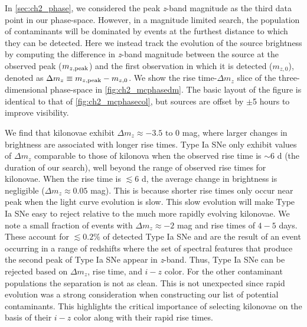 In \autoref{sec:ch2_phase}, we considered the peak {\em z}-band magnitude as the third data point in our phase-space. However, in a magnitude limited search, the population of contaminants will be dominated by events at the furthest distance to which they can be detected. Here we instead track the evolution of the source brightness by computing the difference in {\em z}-band magnitude between the source at the observed peak ($m_{z,{\rm peak}}$) and the first observation in which it is detected ($m_{z,0}$), denoted as $\Delta m_z \equiv m_{z,{\rm peak}} - m_{z,0}$. We show the rise time-$\Delta m_z$ slice of the three-dimensional phase-space in \autoref{fig:ch2_mcphasedm}. The basic layout of the figure is identical to that of \autoref{fig:ch2_mcphasecol}, but sources are offset by $\pm$5 hours to improve visibility.

We find that kilonovae exhibit $\Delta m_z \approx -3.5\text{ to }0$ mag, where larger changes in brightness are associated with longer rise times. Type Ia SNe only exhibit values of $\Delta m_z$ comparable to those of kilonova when the observed rise time is $\sim6$ d (the duration of our search), well beyond the range of observed rise times for kilonovae. When the rise time is $\lesssim6$ d, the average change in brightness is negligible ($\Delta m_z \approx 0.05$ mag). This is because shorter rise times only occur near peak when the light curve evolution is slow. This slow evolution will make Type Ia SNe easy to reject relative to the much more rapidly evolving kilonovae. We note a small fraction of events with $\Delta m_z \approx -2$ mag and rise times of $4-5$ days. These account for $\lesssim0.2\%$ of detected Type Ia SNe and are the result of an event occurring in a range of redshifts where the set of spectral features that produce the second peak of Type Ia SNe appear in {\em z}-band. Thus, Type Ia SNe can be rejected based on $\Delta m_z$, rise time, and $i-z$ color. For the other contaminant populations the separation is not as clean. This is not unexpected since rapid evolution was a strong consideration when constructing our list of potential contaminants. This highlights the critical importance of selecting kilonovae on the basis of their $i-z$ color along with their rapid rise times.

